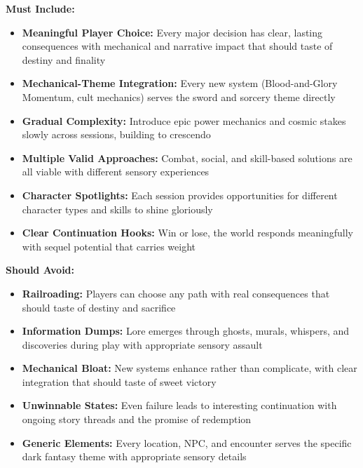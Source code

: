 \documentclass[11pt]{article}
\begin{document}
\begin{itemize}
\textbf{Must Include:}
\begin{itemize}
\item \checkmark \textbf{Meaningful Player Choice:} Every major decision has clear, lasting consequences with mechanical and narrative impact that should taste of destiny and finality
\item \checkmark \textbf{Mechanical-Theme Integration:} Every new system (Blood-and-Glory Momentum, cult mechanics) serves the sword and sorcery theme directly
\item \checkmark \textbf{Gradual Complexity:} Introduce epic power mechanics and cosmic stakes slowly across sessions, building to crescendo
\item \checkmark \textbf{Multiple Valid Approaches:} Combat, social, and skill-based solutions are all viable with different sensory experiences
\item \checkmark \textbf{Character Spotlights:} Each session provides opportunities for different character types and skills to shine gloriously
\item \checkmark \textbf{Clear Continuation Hooks:} Win or lose, the world responds meaningfully with sequel potential that carries weight
\end{itemize}

\textbf{Should Avoid:}
\begin{itemize}
\item \checkmark \textbf{Railroading:} Players can choose any path with real consequences that should taste of destiny and sacrifice
\item \checkmark \textbf{Information Dumps:} Lore emerges through ghosts, murals, whispers, and discoveries during play with appropriate sensory assault
\item \checkmark \textbf{Mechanical Bloat:} New systems enhance rather than complicate, with clear integration that should taste of sweet victory
\item \checkmark \textbf{Unwinnable States:} Even failure leads to interesting continuation with ongoing story threads and the promise of redemption
\item \checkmark \textbf{Generic Elements:} Every location, NPC, and encounter serves the specific dark fantasy theme with appropriate sensory details
\end{itemize}


\end{itemize}
\end{document}
